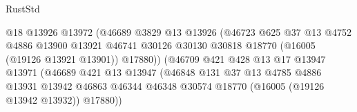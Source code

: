 \begin{lexlean}{RustStd}
\begin{coremodule}
                                            @18
                                            @13926
                                            @13972
                                            (@46689
                                              @3829
                                              @13
                                              @13926
                                              (@46723
                                                @625
                                                @37
                                                @13
                                                @4752
                                                @4886
                                                @13900
                                                @13921
                                                @46741
                                                @30126
                                                @30130
                                                @30818
                                                @18770
                                                (@16005 (@19126 @13921 @13901))
                                                @17880))
                                            (@46709
                                              @421
                                              @428
                                              @13
                                              @17
                                              @13947
                                              @13971
                                              (@46689
                                                @421
                                                @13
                                                @13947
                                                (@46848
                                                  @131
                                                  @37
                                                  @13
                                                  @4785
                                                  @4886
                                                  @13931
                                                  @13942
                                                  @46863
                                                  @46344
                                                  @46348
                                                  @30574
                                                  @18770
                                                  (@16005 (@19126 @13942 @13932))
                                                  @17880))

\end{coremodule}
\end{lexlean}
